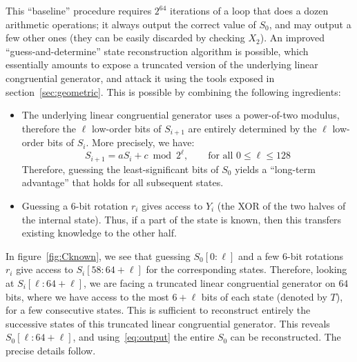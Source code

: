 \documentclass[submission,svgnames,journal=tosc]{iacrtrans}
\begin{document}
This ``baseline'' procedure requires $2^{64}$ iterations of a loop that does a
dozen arithmetic operations; it always output the correct value of $S_0$, and
may output a few other ones (they can be easily discarded by checking $X_2$). An
improved ``guess-and-determine'' state reconstruction algorithm is possible,
which essentially amounts to expose a truncated version of the underlying linear
congruential generator, and attack it using the tools exposed in
section~\ref{sec:geometric}. This is possible by combining the following
ingredients:
\begin{itemize}
\item The underlying linear congruential generator uses a power-of-two modulus,
  therefore the $\ell$ low-order bits of $S_{i+1}$ are entirely determined by
  the $\ell$ low-order bits of $S_i$. More precisely, we have:
  \begin{equation}\label{eq:lcg}
    S_{i+1} = aS_i + c \bmod 2^\ell, \qquad \text{for all } 0 \leq \ell \leq 128
  \end{equation}
  Therefore, guessing the least-significant bits of $S_0$ yields a ``long-term
  advantage'' that holds for all subsequent states.

\item Guessing a 6-bit rotation $r_i$ gives access to $Y_i$ (the XOR of the two
  halves of the internal state). Thus, if a part of the state is known, then
  this transfers existing knowledge to the other half.
\end{itemize}

In figure~\ref{fig:Cknown}, we see that guessing $S_0[0:\ell]$ and a few 6-bit
rotations $r_i$ give access to $S_i[58:64+\ell]$ for the corresponding
states. Therefore, looking at $S_i[\ell:64+\ell]$, we are facing a truncated
linear congruential generator on $64$ bits, where we have access to the most
$6+\ell$ bits of each state (denoted by $T$), for a few consecutive states. This
is sufficient to reconstruct entirely the successive states of this truncated
linear congruential generator. This reveals $S_0[\ell:64+\ell]$, and
using~\eqref{eq:output} the entire $S_0$ can be reconstructed. The precise
details follow.
\end{document}
